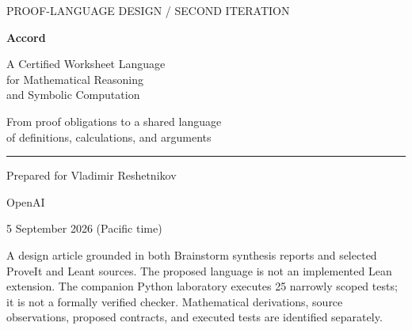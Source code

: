 \documentclass[11pt,a4paper]{article}
\theoremstyle{definition}
\begin{document}
\begin{titlepage}
\color{ink}
{\sffamily\large PROOF-LANGUAGE DESIGN / SECOND ITERATION\par}
\vspace{24mm}
{\sffamily\bfseries\fontsize{39}{43}\selectfont Accord\par}
\vspace{6mm}
{\sffamily\fontsize{24}{29}\selectfont A Certified Worksheet Language\\for Mathematical Reasoning\\and Symbolic Computation\par}
\vspace{12mm}
{\large From proof obligations to a shared language\\of definitions, calculations, and arguments\par}
\vfill
\rule{\textwidth}{.8pt}
\vspace{4mm}
Prepared for Vladimir Reshetnikov\par
OpenAI\par
5 September 2026 (Pacific time)\par
\vspace{6mm}
{\small\color{muted}
A design article grounded in both Brainstorm synthesis reports and selected
ProveIt and Leant sources. The proposed language is not an implemented Lean
extension. The companion Python laboratory executes 25 narrowly scoped tests;
it is not a formally verified checker. Mathematical derivations, source
observations, proposed contracts, and executed tests are identified separately.
}
\end{titlepage}
\end{document}
